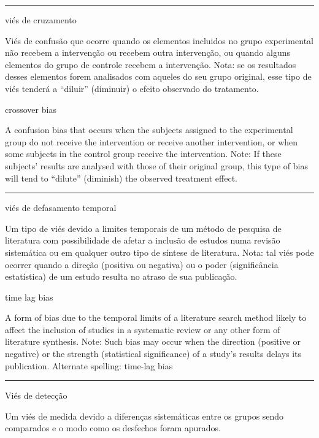 \documentclass[
]{book}
\begin{document}
\begin{center}\rule{0.5\linewidth}{0.5pt}\end{center}

viés de cruzamento

Viés de confusão que ocorre quando os elementos incluidos no grupo experimental não recebem a intervenção ou recebem outra intervenção, ou quando alguns elementos do grupo de controle recebem a intervenção. Nota: se os resultados desses elementos forem analisados com aqueles do seu grupo original, esse tipo de viés tenderá a ``diluir'' (diminuir) o efeito observado do tratamento.

crossover bias

A confusion bias that occurs when the subjects assigned to the experimental group do not receive the intervention or receive another intervention, or when some subjects in the control group receive the intervention. Note: If these subjects' results are analysed with those of their original group, this type of bias will tend to ``dilute'' (diminish) the observed treatment effect.

\begin{center}\rule{0.5\linewidth}{0.5pt}\end{center}

viés de defasamento temporal

Um tipo de viés devido a limites temporais de um método de pesquisa de literatura com possibilidade de afetar a inclusão de estudos numa revisão sistemática ou em qualquer outro tipo de síntese de literatura. Nota: tal viés pode ocorrer quando a direção (positiva ou negativa) ou o poder (significância estatística) de um estudo resulta no atraso de sua publicação.

time lag bias

A form of bias due to the temporal limits of a literature search method likely to affect the inclusion of studies in a systematic review or any other form of literature synthesis. Note: Such bias may occur when the direction (positive or negative) or the strength (statistical significance) of a study's results delays its publication. Alternate spelling: time-lag bias

\begin{center}\rule{0.5\linewidth}{0.5pt}\end{center}

Viés de detecção

Um viés de medida devido a diferenças sistemáticas entre os grupos sendo comparados e o modo como os desfechos foram apurados.
\end{document}
